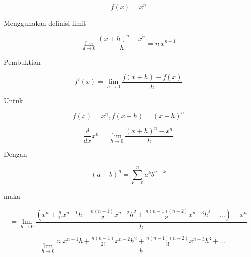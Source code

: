 \documentclass[a4paper,10pt]{article}
\begin{document}
\begin{eulernotebook}
\begin{eulercomment}
\begin{eulercomment}
\begin{eulercomment}
\begin{eulercomment}
\begin{eulercomment}
\begin{eulercomment}
\begin{eulercomment}
\begin{eulercomment}
\begin{eulercomment}
\begin{eulercomment}
\begin{eulercomment}
\begin{eulercomment}
\begin{eulercomment}
\begin{eulercomment}
\begin{eulercomment}
\begin{eulercomment}
\begin{eulercomment}
\end{eulercomment}
\begin{eulerformula}
\[
f(x) = x^n
\]
\end{eulerformula}
\begin{eulercomment}
Menggunakan definisi limit
\end{eulercomment}
\begin{eulerformula}
\[
\lim_{h\rightarrow 0}{\frac{\left(x+h\right)^{n}-x^{n}}{h}}=n\,x^{n  -1}
\]
\end{eulerformula}
\begin{eulercomment}
Pembuktian

\end{eulercomment}
\begin{eulerformula}
\[
f'(x) = \lim_{h\to 0} \frac{f(x+h)-f(x)}{h}
\]
\end{eulerformula}
\begin{eulercomment}
Untuk\\
\end{eulercomment}
\begin{eulerformula}
\[
f(x)=x^{n}, f(x+h)=(x+h)^n
\]
\end{eulerformula}
\begin{eulerformula}
\[
\frac{d}{dx}x^n = \lim_{h\to 0} \frac{(x+h)^{n}-x^{n}}{h}
\]
\end{eulerformula}
\begin{eulercomment}
Dengan\\
\end{eulercomment}
\begin{eulerformula}
\[
(a+b)^{n}=\sum_{k=0}^n a^{k}b^{n-k}
\]
\end{eulerformula}
\begin{eulercomment}
maka\\
\end{eulercomment}
\begin{eulerformula}
\[
= \lim_{h\to 0} \frac{(x^{n}+\frac{n}{1!}x^{n-1}h+\frac{n(n-1)}{2!}x^{n-2}h^2+\frac{n(n-1)(n-2)}{3!}x^{n-3}h^{3}+...)-x^{n}}{h}
\]
\end{eulerformula}
\begin{eulerformula}
\[
= \lim_{h\to 0} \frac{n.x^{n-1}h+\frac{n(n-1)}{2!}x^{n-2}h^2+\frac{n(n-1)(n-2)}{3!}x^{n-3}h^{3}+...}{h}
\]
\end{eulerformula}
\begin{eulerformula}

\end{eulerformula}
\end{eulercomment}
\end{eulercomment}
\end{eulercomment}
\end{eulercomment}
\end{eulercomment}
\end{eulercomment}
\end{eulercomment}
\end{eulercomment}
\end{eulercomment}
\end{eulercomment}
\end{eulercomment}
\end{eulercomment}
\end{eulercomment}
\end{eulercomment}
\end{eulercomment}
\end{eulercomment}
\end{eulernotebook}
\end{document}
